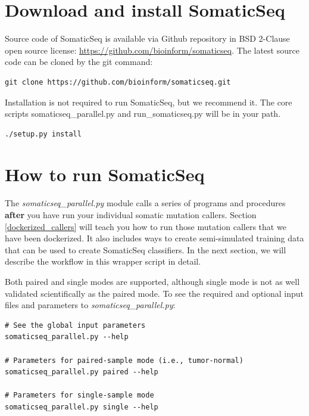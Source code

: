 \documentclass[10pt,letterpaper]{article}
\begin{document}
\begin{sloppypar}
\begin{itemize}
\end{itemize}



\section{Download and install SomaticSeq} \label{download_somaticseq}

Source code of SomaticSeq is available via Github repository in BSD 2-Clause open source license: \href{https://github.com/bioinform/somaticseq}{https://github.com/bioinform/somaticseq}. The latest source code can be cloned by the git command:
\begin{lstlisting}
git clone https://github.com/bioinform/somaticseq.git
\end{lstlisting}


Installation is not required to run SomaticSeq, but we recommend it. The core scripts somaticseq\_parallel.py and run\_somaticseq.py will be in your path. 
\begin{lstlisting}
./setup.py install
\end{lstlisting}



\section{How to run SomaticSeq} \label{Wrapper_script}

The \textit{somaticseq\_parallel.py} module calls a series of programs and procedures \textbf{after} you have run your individual somatic mutation callers. Section \ref{dockerized_callers} will teach you how to run those mutation callers that we have been dockerized. It also includes ways to create semi-simulated training data that can be used to create SomaticSeq classifiers. In the next section, we will describe the workflow in this wrapper script in detail. 

Both paired and single modes are supported, although single mode is not as well validated scientifically as the paired mode. To see the required and optional input files and parameters to \textit{somaticseq\_parallel.py}:

\begin{lstlisting}
# See the global input parameters
somaticseq_parallel.py --help

# Parameters for paired-sample mode (i.e., tumor-normal)
somaticseq_parallel.py paired --help

# Parameters for single-sample mode
somaticseq_parallel.py single --help
\end{lstlisting}



\end{sloppypar}
\end{document}
